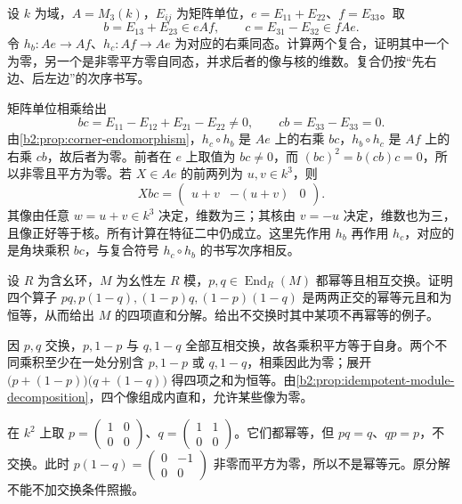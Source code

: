 \begin{exercise}\label{b2:ex:11-corner-hom}
	设 \(k\) 为域，\(A=M_3(k)\)，\(E_{ij}\) 为矩阵单位，\(e=E_{11}+E_{22}\)、\(f=E_{33}\)。取
	\[
		b=E_{13}+E_{23}\in eAf, \qquad c=E_{31}-E_{32}\in fAe.
	\]
	令 \(h_b:Ae\to Af\)、\(h_c:Af\to Ae\) 为对应的右乘同态。计算两个复合，证明其中一个为零，另一个是非零平方零自同态，并求后者的像与核的维数。复合仍按“先右边、后左边”的次序书写。
\end{exercise}
\begin{solution}
	矩阵单位相乘给出
	\[
		bc=E_{11}-E_{12}+E_{21}-E_{22}\ne0, \qquad cb=E_{33}-E_{33}=0.
	\]
	由\cref{b2:prop:corner-endomorphism}，\(h_c\circ h_b\) 是 \(Ae\) 上的右乘 \(bc\)，\(h_b\circ h_c\) 是 \(Af\) 上的右乘 \(cb\)，故后者为零。前者在 \(e\) 上取值为 \(bc\ne0\)，而 \((bc)^2=b(cb)c=0\)，所以非零且平方为零。若 \(X\in Ae\) 的前两列为 \(u,v\in k^3\)，则
	\[
		Xbc=\begin{pmatrix}u+v&-(u+v)&0\end{pmatrix}.
	\]
	其像由任意 \(w=u+v\in k^3\) 决定，维数为三；其核由 \(v=-u\) 决定，维数也为三，且像正好等于核。所有计算在特征二中仍成立。这里先作用 \(h_b\) 再作用 \(h_c\)，对应的是角块乘积 \(bc\)，与复合符号 \(h_c\circ h_b\) 的书写次序相反。
\end{solution}

\begin{exercise}\label{b2:ex:11-commuting-projections}
	设 \(R\) 为含幺环，\(M\) 为幺性左 \(R\) 模，\(p,q\in\operatorname{End}_R(M)\) 都幂等且相互交换。证明四个算子 \(pq,p(1-q),(1-p)q,(1-p)(1-q)\) 是两两正交的幂等元且和为恒等，从而给出 \(M\) 的四项直和分解。给出不交换时其中某项不再幂等的例子。
\end{exercise}
\begin{solution}
	因 \(p,q\) 交换，\(p,1-p\) 与 \(q,1-q\) 全部互相交换，故各乘积平方等于自身。两个不同乘积至少在一处分别含 \(p,1-p\) 或 \(q,1-q\)，相乘因此为零；展开 \(\bigl(p+(1-p)\bigr)\bigl(q+(1-q)\bigr)\) 得四项之和为恒等。由\cref{b2:prop:idempotent-module-decomposition}，四个像组成内直和，允许某些像为零。

	在 \(k^2\) 上取 \(p=\begin{pmatrix}1&0\\0&0\end{pmatrix}\)、\(q=\begin{pmatrix}1&1\\0&0\end{pmatrix}\)。它们都幂等，但 \(pq=q\)、\(qp=p\)，不交换。此时 \(p(1-q)=\begin{pmatrix}0&-1\\0&0\end{pmatrix}\) 非零而平方为零，所以不是幂等元。原分解不能不加交换条件照搬。
\end{solution}

